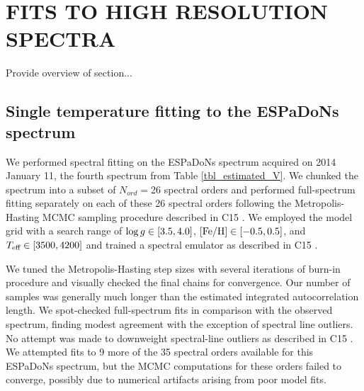 \documentclass[twocolumn]{emulateapj}%
\newcommand{\iancze}{{\sc C15 }}
\begin{document}



\section{FITS TO HIGH RESOLUTION SPECTRA}

Provide overview of section...  


\subsection{Single temperature fitting to the ESPaDoNs spectrum}

We performed spectral fitting on the ESPaDoNs spectrum acquired on 2014 January 11, the fourth spectrum from Table \ref{tbl_estimated_V}.  We chunked the spectrum into a subset of $N_{ord}=$26 spectral orders and performed full-spectrum fitting separately on each of these 26 spectral orders following the Metropolis-Hasting MCMC sampling procedure described in \iancze.  We employed the \PHOENIX model grid with a search range of $\log g \in [3.5, 4.0]$, $[{\rm Fe}/{\rm H}] \in [-0.5, 0.5]$, and $T_\textrm{eff} \in [3500, 4200]$ and trained a spectral emulator as described in \iancze.  

We tuned the Metropolis-Hasting step sizes with several iterations of burn-in procedure and visually checked the final chains for convergence.  Our number of samples was generally much longer than the estimated integrated autocorrelation length.  We spot-checked full-spectrum fits in comparison with the observed spectrum, finding modest agreement with the exception of spectral line outliers.  No attempt was made to downweight spectral-line outliers as described in \iancze.  We attempted fits to 9 more of the 35 spectral orders available for this ESPaDoNs spectrum, but the MCMC computations for these orders failed to converge, possibly due to numerical artifacts arising from poor model fits.
\end{document}
